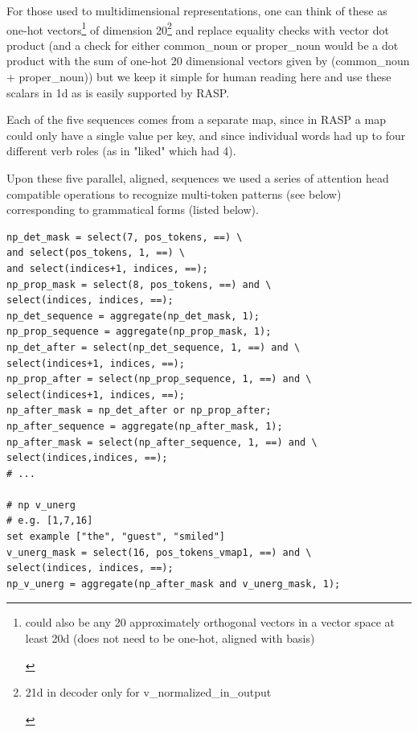\documentclass[11pt]{article}
\begin{document}
For those used to multidimensional representations, one can think of these as one-hot vectors\footnote{\begin{footnotesize}could also be any 20 approximately orthogonal vectors in a vector space at least 20d (does not need to be one-hot, aligned with basis)\end{footnotesize}} of dimension 20\footnote{\begin{footnotesize}21d in decoder only for v\_normalized\_in\_output\end{footnotesize}} and replace equality checks with vector dot product (and a check for either common\_noun or proper\_noun would be a dot product with the sum of one-hot 20 dimensional vectors given by (common\_noun + proper\_noun)) but we keep it simple for human reading here and use these scalars in 1d as is easily supported by RASP.

Each of the five sequences comes from a separate map, since in RASP a map could only have a single value per key, and since individual words had up to four different verb roles (as in "liked" which had 4).

Upon these five parallel, aligned, sequences we used a series of attention head compatible operations to recognize multi-token patterns (see below) corresponding to grammatical forms (listed below). 

\begin{tiny}
\begin{verbatim}
np_det_mask = select(7, pos_tokens, ==) \
and select(pos_tokens, 1, ==) \
and select(indices+1, indices, ==);
np_prop_mask = select(8, pos_tokens, ==) and \
select(indices, indices, ==);
np_det_sequence = aggregate(np_det_mask, 1);
np_prop_sequence = aggregate(np_prop_mask, 1);
np_det_after = select(np_det_sequence, 1, ==) and \
select(indices+1, indices, ==);
np_prop_after = select(np_prop_sequence, 1, ==) and \
select(indices+1, indices, ==);
np_after_mask = np_det_after or np_prop_after;
np_after_sequence = aggregate(np_after_mask, 1);
np_after_mask = select(np_after_sequence, 1, ==) and \
select(indices,indices, ==);
# ...

# np v_unerg
# e.g. [1,7,16]
set example ["the", "guest", "smiled"]
v_unerg_mask = select(16, pos_tokens_vmap1, ==) and \
select(indices, indices, ==);
np_v_unerg = aggregate(np_after_mask and v_unerg_mask, 1);
\end{verbatim}
\end{tiny}
\end{document}
